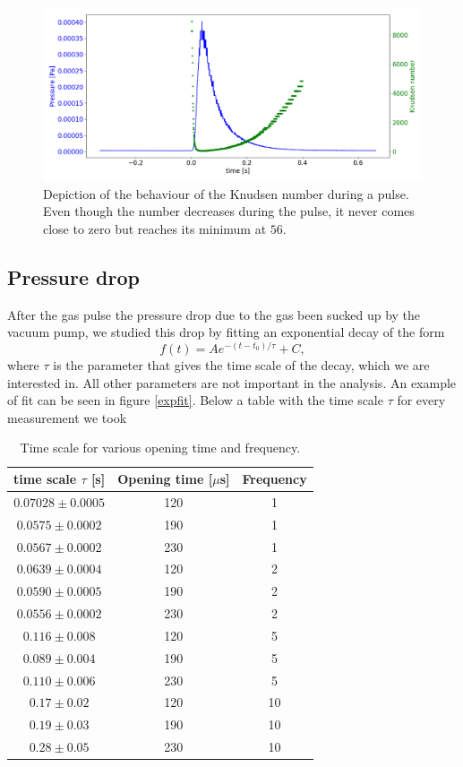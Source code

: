 \documentclass[a4paper,10pt]{article}
\begin{document}
\begin{figure}[H]
	\centering
	\includegraphics[width = \textwidth]{knudsen}
	\caption{Depiction of the behaviour of the Knudsen number during a pulse. Even though the number decreases during the pulse, it never comes close to zero but reaches its minimum at $56$. }
	\label{fig_knudsennumber}
\end{figure}

\subsection{Pressure drop}
After the gas pulse the pressure drop due to the gas been sucked up by the vacuum pump, we studied this drop by fitting an exponential decay of the form
\[f(t) = Ae^{-(t - t_0)/\tau} + C,\]
where $\tau$ is the parameter that gives the time scale of the decay, which we are interested in. All other parameters are not important in the analysis. An example of fit can be seen in figure \ref{expfit}. Below a table with the time scale $\tau$ for every measurement we took
\begin{table}[H]
\centering
\begin{tabular}{ccc} \toprule
    time scale $\tau$ [s] & Opening time [$\mu$s] & Frequency \\ \midrule
$0.07028 \pm 0.0005 $& 120& 1\\
$0.0575 \pm 0.0002$& 190& 1\\

$0.0567 \pm 0.0002$& 230& 1\\\midrule
$0.0639 \pm 0.0004$& 120& 2\\
$0.0590 \pm 0.0005$& 190& 2\\
$0.0556 \pm 0.0002 $& 230& 2\\ \midrule
$0.116 \pm 0.008$& 120& 5\\
$0.089 \pm 0.004$ & 190& 5\\ 
$0.110 \pm  0.006$ & 230& 5\\\midrule
$0.17 \pm  0.02$& 120& 10\\ 
$0.19 \pm 0.03$ & 190& 10\\
$0.28 \pm 0.05 $ & 230& 10\\ \bottomrule
\end{tabular}
\caption{Time scale for various opening time and frequency. }
\end{table}
\end{document}
